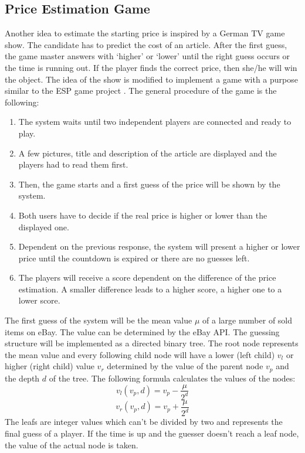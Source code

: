 \subsection{Price Estimation Game}
Another idea to estimate the starting price is inspired by a German TV game show. The candidate has to predict the cost of an article. After the first guess, the game master answers with `higher' or `lower' until the right guess occurs or the time is running out. If the player finds the correct price, then she/he will win the object.  
The idea of the show is modified to implement a game with a purpose similar to the ESP game project \cite{esp}. The general procedure of the game is the following: 
\begin{enumerate}
	\item The system waits until two independent players are connected and ready to play. 
	\item A few pictures, title and description of the article are displayed and the players had to read them first. 
	\item Then, the game starts and a first guess of the price will be shown by the system. 
	\item Both users have to decide if the real price is higher or lower than the displayed one. 
	\item Dependent on the previous response, the system will present a higher or lower price until the countdown is expired or there are no guesses left. 
	\item The players will receive a score dependent on the difference of the price estimation. A smaller difference leads to a higher score, a higher one to a lower score. 
\end{enumerate}
The first guess of the system will be the mean value \( \mu \) of a large number of sold items on eBay. The value can be determined by the eBay API. The guessing structure will be implemented as a directed binary tree. The root node represents the mean value and every following child node will have a lower (left child) \( v_l \) or higher (right child) value  \( v_r \) determined by the value of the parent node  \( v_p \) and the depth  \( d \) of the tree. The following formula calculates the values of the nodes: 
\begin{equation}
v_l(v_p,d) = v_p - \frac{\mu}{2^d}
\end{equation}
\begin{equation}
v_r(v_p,d) = v_p + \frac{\mu}{2^d}
\end{equation}
The leafs are integer values which can't be divided by two and represents the final guess of a player. If the time is up and the guesser doesn't reach a leaf node, the value of the actual node is taken. 
